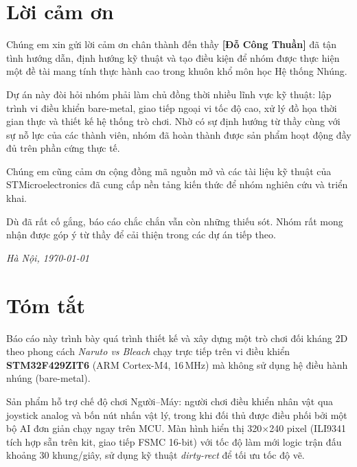\documentclass[a4paper,12pt]{report}
\begin{document}
\chapter*{Lời cảm ơn}

Chúng em xin gửi lời cảm ơn chân thành đến thầy \textbf{[Đỗ Công Thuần]} đã tận tình hướng dẫn, định hướng kỹ thuật và tạo điều kiện để nhóm được thực hiện một đề tài mang tính thực hành cao trong khuôn khổ môn học Hệ thống Nhúng.

Dự án này đòi hỏi nhóm phải làm chủ đồng thời nhiều lĩnh vực kỹ thuật: lập trình vi điều khiển bare-metal, giao tiếp ngoại vi tốc độ cao, xử lý đồ họa thời gian thực và thiết kế hệ thống trò chơi. Nhờ có sự định hướng từ thầy cùng với sự nỗ lực của các thành viên, nhóm đã hoàn thành được sản phẩm hoạt động đầy đủ trên phần cứng thực tế.

Chúng em cũng cảm ơn cộng đồng mã nguồn mở và các tài liệu kỹ thuật của STMicroelectronics đã cung cấp nền tảng kiến thức để nhóm nghiên cứu và triển khai.

Dù đã rất cố gắng, báo cáo chắc chắn vẫn còn những thiếu sót. Nhóm rất mong nhận được góp ý từ thầy để cải thiện trong các dự án tiếp theo.

\vspace{1cm}
\begin{flushright}
    \textit{Hà Nội, \today}
\end{flushright}
\newpage

\chapter*{Tóm tắt}

Báo cáo này trình bày quá trình thiết kế và xây dựng một trò chơi đối kháng 2D theo phong cách \textit{Naruto vs Bleach} chạy trực tiếp trên vi điều khiển \textbf{STM32F429ZIT6} (ARM Cortex-M4, 16\,MHz) mà không sử dụng hệ điều hành nhúng (bare-metal).

Sản phẩm hỗ trợ chế độ chơi Người--Máy: người chơi điều khiển nhân vật qua joystick analog và bốn nút nhấn vật lý, trong khi đối thủ được điều phối bởi một bộ AI đơn giản chạy ngay trên MCU. Màn hình hiển thị 320$\times$240 pixel (ILI9341 tích hợp sẵn trên kit, giao tiếp FSMC 16-bit) với tốc độ làm mới logic trận đấu khoảng 30 khung/giây, sử dụng kỹ thuật \textit{dirty-rect} để tối ưu tốc độ vẽ.
\end{document}
